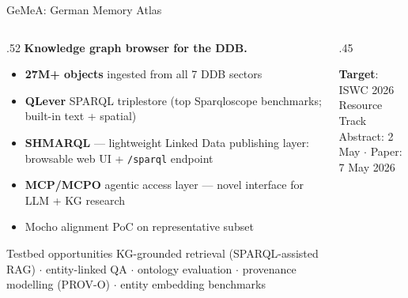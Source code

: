 \documentclass[xcolor,aspectratio=169,compress]{beamer}
\begin{document}
\begin{frame}{GeMeA: German Memory Atlas}
  \begin{columns}
    \begin{column}{.52\textwidth}
      \textbf{Knowledge graph browser for the DDB.}
      \medskip
      \begin{itemize}\setlength{\itemsep}{4pt}
        \item \textbf{27M+ objects} ingested from all 7 DDB sectors
        \item \textbf{QLever} SPARQL triplestore
              (top Sparqloscope benchmarks; built-in text + spatial)
        \item \textbf{SHMARQL} --- lightweight Linked Data publishing layer:
              browsable web UI + \texttt{/sparql} endpoint
        \item \textbf{MCP/MCPO} agentic access layer ---
              novel interface for LLM + KG research
        \item Mocho alignment PoC on representative subset
      \end{itemize}
      \medskip
      \begin{block}{Testbed opportunities}
        \footnotesize
        KG-grounded retrieval (SPARQL-assisted RAG) $\cdot$
        entity-linked QA $\cdot$
        ontology evaluation $\cdot$
        provenance modelling (PROV-O) $\cdot$
        entity embedding benchmarks
      \end{block}
    \end{column}
    \begin{column}{.45\textwidth}
      \begin{center}
      \end{center}
      \smallskip
      \footnotesize
      \textbf{Target}: ISWC 2026 Resource Track\\
      Abstract: 2 May $\cdot$ Paper: 7 May 2026
    \end{column}
  \end{columns}
\end{frame}
\end{document}
